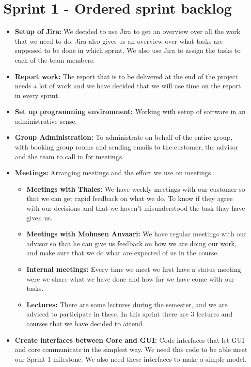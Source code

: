 \section{Sprint 1 - Ordered sprint backlog}

\begin{itemize}
\item{}\textbf{Setup of Jira:} We decided to use Jira to get an overview over all the work that we need to do. Jira also gives us an overview over what tasks are supposed to be done in which sprint. We also use Jira to assign the tasks to each of the team members.
\item{}\textbf{Report work:} The report that is to be delivered at the end of the project needs a lot of work and we have decided that we will use time on the report in every sprint.
\item{}\textbf{Set up programming environment:} Working with setup of software in an administrative sense.
\item{}\textbf{Group Administration:} To administrate on behalf of the entire group, with booking group rooms and sending emails to the customer, the advisor and the team to call in for meetings.
\item{}\textbf{Meetings:} Arranging meetings and the effort we use on meetings.
\begin{itemize}
\item{}\textbf{Meetings with Thales:} We have weekly meetings with our customer so that we can get rapid feedback on what we do. To know if they agree with our decisions and that we haven't misunderstood the task thay have given us.
\item{}\textbf{Meetings with Mohnsen Anvaari:} We have regular meetings with our advisor so that he can give us feedback on how we are doing our work, and make sure that we do what are expected of us in the course.
\item{}\textbf{Internal meetings:} Every time we meet we first have a status meeting were we share what we have done and how far we have come with our tasks.
\item{}\textbf{Lectures:} There are some lectures during the semester, and we are adviced to participate in these. In this sprint there are 3 lectures and courses that we have decided to attend.
\end{itemize}
\item{}\textbf{Create interfaces between Core and GUI:} Code interfaces that let GUI and core communicate in the simplest way. We need this code to be able meet our Sprint 1 milestone. We also need these interfaces to make a simple model.

\end{itemize}
